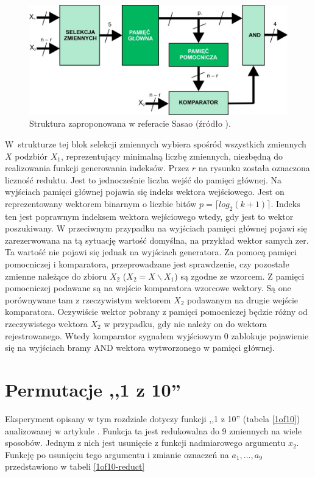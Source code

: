 \begin{figure}[H]
\centering
\includegraphics[width = 13cm]{chapter04/sasao-structure.jpg}
\caption{Struktura zaproponowana w referacie Sasao (źródło \cite{sasao-workshop}).}
\label{fig:sasao-structure}
\end{figure}

W~strukturze tej blok selekcji zmiennych wybiera spośród wszystkich zmiennych $X$ podzbiór $X_1$,
reprezentujący minimalną liczbę zmiennych,
niezbędną do realizowania funkcji generowania indeksów.
Przez $r$ na rysunku została oznaczona liczność reduktu.
Jest to jednocześnie liczba wejść do pamięci głównej.
Na wyjściach pamięci głównej pojawia się indeks wektora wejściowego. %
Jest on reprezentowany wektorem binarnym o liczbie bitów $p = \lceil log_2 (k+1)\rceil$.
Indeks ten jest poprawnym indeksem wektora wejściowego wtedy,
gdy jest to wektor poszukiwany.
W przeciwnym przypadku na wyjściach pamięci głównej pojawi się zarezerwowana na tą sytuację wartość domyślna,
na przykład wektor samych zer.
Ta wartość nie pojawi się jednak na wyjściach generatora.
Za pomocą pamięci pomocniczej i komparatora,
przeprowadzane jest sprawdzenie,
czy pozostałe zmienne należące do zbioru $X_2$ ($X_2 = X \backslash X_1$) są zgodne ze wzorcem.
Z pamięci pomocniczej podawane są na wejście komparatora wzorcowe wektory.
Są one porównywane tam z rzeczywistym wektorem $X_2$ podawanym na drugie wejście komparatora.
Oczywiście wektor pobrany z pamięci pomocniczej będzie różny od rzeczywistego wektora $X_2$ w przypadku,
gdy nie należy on do wektora rejestrowanego.
Wtedy komparator sygnałem wyjściowym 0 zablokuje pojawienie się na wyjściach bramy AND wektora wytworzonego w pamięci głównej.

\section{Permutacje ,,1 z 10''}

Eksperyment opisany w tym rozdziale dotyczy funkcji ,,1 z 10'' (tabela \ref{1of10}) analizowanej w artykule \cite{sasao-s-min}.
Funkcja ta jest redukowalna do 9 zmiennych na wiele sposobów.
Jednym z nich jest usunięcie z funkcji nadmiarowego argumentu $x_2$.
Funkcję po usunięciu tego argumentu i zmianie oznaczeń na $a_1, ..., a_9$ przedstawiono w tabeli \ref{1of10-reduct}

